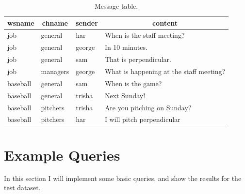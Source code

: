 \documentclass{article}
\begin{document}
\begin{table}[!p]
\centering
\begin{tabular}{l l l l}
\toprule
\multicolumn{1}{c}{wsname} &
\multicolumn{1}{c}{chname} &
\multicolumn{1}{c}{sender} &
\multicolumn{1}{c}{content} \\
\midrule
job & general & har & When is the staff meeting? \\
job & general & george & In 10 minutes. \\
job & general & sam  & That is perpendicular. \\
\midrule
job & managers & george  & What is happening at the staff meeting? \\
\midrule
baseball & general & sam & When is the game? \\
baseball & general & trisha & Next Sunday! \\
\midrule
baseball & pitchers & trisha & Are you pitching on Sunday? \\
baseball & pitchers & har & I will pitch perpendicular \\
\bottomrule
\end{tabular}
\caption{Message table.}
\label{tbl:message}
\end{table}

\section{Example Queries}

In this section I will implement some basic queries, and show the results for the test dataset.
\end{document}
